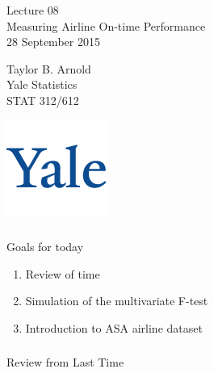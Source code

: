 



\begin{frame}[fragile] \frametitle{}

\vfill

{\fontsize{0.7cm}{0cm}\selectfont Lecture 08 \\\vspace{0.2cm}
Measuring Airline On-time Performance}\\\vspace{0.5cm}
28 September 2015

\vspace{2cm}

\begin{minipage}{0.6\textwidth}
Taylor B. Arnold \\
Yale Statistics \\
STAT 312/612
\end{minipage}
\hfill
\begin{minipage}{0.3\textwidth}\raggedleft
\includegraphics[scale=0.3]{../yale-logo.png}
\end{minipage}%

\end{frame}

\begin{frame}[fragile] \frametitle{}

{\color{yaleblue}\fontsize{16pt}{20pt}\selectfont Goals for today}

\begin{enumerate}
\item Review of time
\item Simulation of the multivariate F-test
\item Introduction to ASA airline dataset
\end{enumerate}

\end{frame}

\begin{frame}[fragile] \frametitle{}

\begin{flushright}
{\color{yaleblue}\sc\fontsize{1cm}{0cm}\selectfont Review from Last Time}
\end{flushright}

\end{frame}

